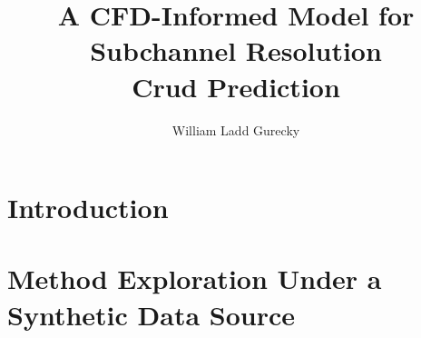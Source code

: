 \documentclass[12pt]{report}
\author{William Ladd Gurecky}
\title{A CFD-Informed Model for Subchannel Resolution \\ Crud Prediction}
\newcommand{\hsp}{\hspace{20pt}}
\begin{document}
\copyrightpage          %
\commcertpage           %
\titlepage              %
	
\renewcommand{\thepage}{\roman{page}}




%

\pagebreak
\tableofcontents
\pagebreak



\titleformat{\chapter}[hang]{\Huge\bfseries}{\thechapter\hsp\textcolor{gray75}{|}\hsp}{0pt}{\Huge\bfseries}
\renewcommand{\thepage}{\arabic{page}} %
\setcounter{page}{1}
\doublespacing  %
%
\chapter{Introduction}
\label{chap:intro}


\chapter{Method Exploration Under a Synthetic Data Source}
\label{chap:work}



\printindex


\end{document}
